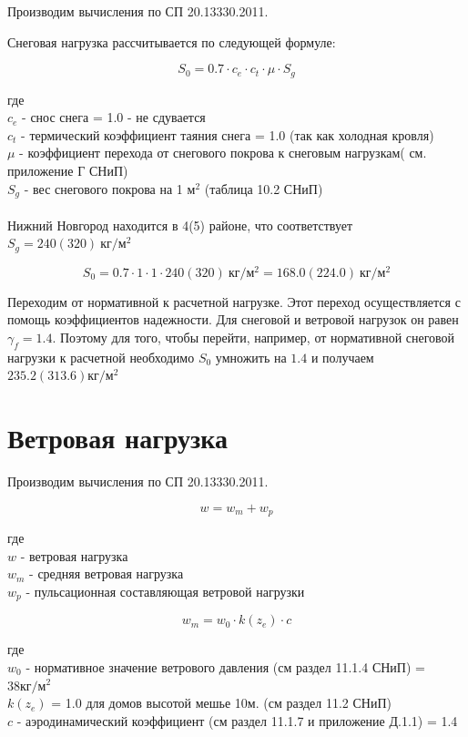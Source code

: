 \documentclass[10pt, twocolumn]{report}
\begin{document}
Производим вычисления по СП 20.13330.2011.

Снеговая нагрузка рассчитывается по следующей формуле:

$$ S_0 = 0.7 \cdot c_e \cdot c_t \cdot \mu \cdot S_g $$

где \\
\noindent
$c_e$ - снос снега = 1.0 - не сдувается \\
$c_t$ - термический коэффициент таяния снега = 1.0 (так как холодная кровля) \\
$\mu$ - коэффициент перехода от снегового покрова к снеговым нагрузкам( см. приложение Г СНиП) \\
$S_g$ - вес снегового покрова на 1 $\text{м}^2$ (таблица 10.2 СНиП)
\\ \\
\noindent Нижний Новгород находится в 4(5) районе, что соответствует $S_g = 240(320) \ \text{кг}/\text{м}^2$

$$ S_0 = 0.7 \cdot 1 \cdot 1 \cdot 240(320) \ \text{кг}/\text{м}^2 = 168.0(224.0) \ \text{кг}/\text{м}^2 $$


\noindent  Переходим от нормативной к расчетной нагрузке. Этот переход осуществляется с помощь коэффициентов надежности. Для снеговой и ветровой нагрузок он равен $\gamma_f = 1.4$. Поэтому для того, чтобы перейти, например, от нормативной снеговой нагрузки к расчетной необходимо $S_0$ умножить на $1.4$ и получаем $235.2(313.6) \text{кг}/\text{м}^2	$



\section{Ветровая нагрузка}

Производим вычисления по СП 20.13330.2011.

$$ w = w_m + w_p$$

где \\
\noindent
$w$ - ветровая нагрузка \\
$w_m$ - средняя ветровая нагрузка \\
$w_p$ - пульсационная составляющая ветровой нагрузки

$$w_m = w_0 \cdot k(z_e) \cdot c$$

где \\
\noindent
$w_0$ - нормативное значение ветрового давления (см раздел 11.1.4 СНиП) = $38 \text{кг}/\text{м}^2$ \\
$k(z_e)$ = 1.0 для домов высотой мешье 10м. (см раздел 11.2 СНиП) \\
$c$ - аэродинамический коэффициент (см раздел 11.1.7 и приложение Д.1.1) = 1.4 \\
\end{document}
